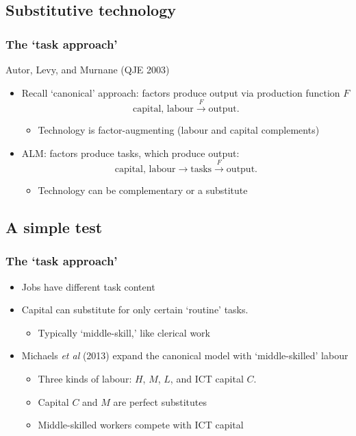 \documentclass[red]{beamer}
\newcommand{\vitem}{\vfill\item}
\begin{document}
\subsection{Substitutive technology}
\begin{frame}[c]
\frametitle{The `task approach'}
Autor, Levy, and Murnane (QJE 2003)
\vfill
\begin{itemize}
\item Recall `canonical' approach: factors produce output via 
       production function $F$
\[ \text{capital, labour} \overset{F}{\longrightarrow} \text{output}. \]
\begin{itemize}
\item Technology is factor-augmenting (labour and capital complements)
\vfill
\end{itemize}
\vitem ALM: factors produce tasks, which produce output:
\[ \text{capital, labour} \longrightarrow \text{tasks} \overset{F}{\longrightarrow} \text{output}. \]
\begin{itemize}
\item Technology can be complementary or a substitute
\end{itemize}
\end{itemize}
\end{frame}

\subsection{A simple test}
\begin{frame}
\frametitle{The `task approach'}
\begin{itemize}
\vitem Jobs have different task content
\vitem Capital can substitute for only certain `routine' tasks.
  \begin{itemize}
  \item Typically `middle-skill,' like clerical work
  \end{itemize}
\vitem Michaels {\em et al} (2013) expand the canonical model with `middle-skilled' labour
  \begin{itemize}
  \item Three kinds of labour: $H$, $M$, $L$, and ICT capital $C$. 
  \item Capital $C$ and $M$ are perfect substitutes
  \item Middle-skilled workers compete with ICT capital
  \end{itemize}
\end{itemize}
\end{frame}
\end{document}
